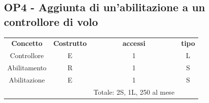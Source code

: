     \subsection*{OP4 - Aggiunta di un'abilitazione a un controllore di volo}
    \begin{table}[H]
    \centering
    \begin{tabular}{cccc}
  
    \rowcolor{tableheadercolor}
    \textbf{Concetto} & \textbf{Costrutto} & \textbf{accessi} & \textbf{tipo}\\
  
    Controllore & E & 1 & L \\
    Abilitamento & R & 1 & S \\
    Abilitazione & E & 1 & S \\
    & & Totale: 2S, 1L, 250 al mese &\\
  
    \end{tabular}
    \end{table}

